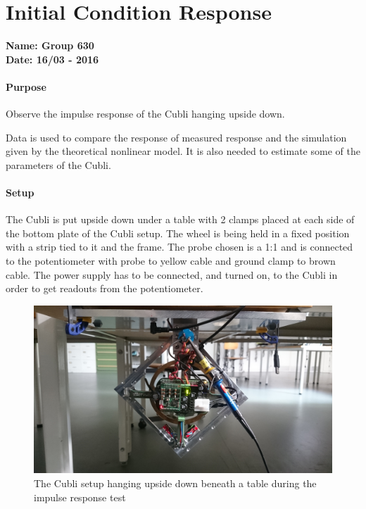 \chapter{Initial Condition Response}\label{impulseResponseAppendix} 

\textbf{Name: Group 630}\\
\textbf{Date: 16/03 - 2016}

\subsubsection{Purpose}
Observe the impulse response of the Cubli hanging upside down.

Data is used to compare the response of measured response and the simulation given by the theoretical nonlinear model. It is also needed to estimate some of the parameters of the Cubli.


\subsubsection{Setup}
The Cubli is put upside down under a table with 2 clamps placed at each side of the bottom plate of the Cubli setup.
The wheel is being held in a fixed position with a strip tied to it and the frame. The probe chosen is a 1:1 and is connected to the potentiometer with probe to yellow cable and ground clamp to brown cable. The power supply has to be connected, and turned on, to the Cubli in order to get readouts from the potentiometer.
\begin{figure}[H] 
	\centering 
	\includegraphics[scale=0.08]{figures/impulseResponseSetup}
	\caption{The Cubli setup hanging upside down beneath a table during the impulse response test}
	\label{impulseResponseTestPicture}
\end{figure} 


